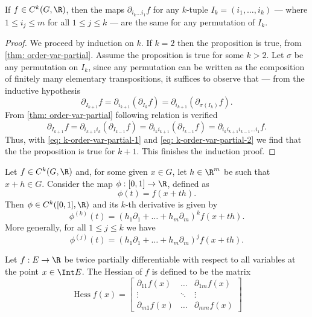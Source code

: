 \begin{corollary}\label{cor: k-order-var-partial}
  If \(f \in C^k(G, \R)\), then the maps \(\partial_{i_k \dots i_1} f\) for any
  \(k\)-tuple \(I_k = (i_1, \dots, i_k)\) --- where \(1 \leq i_j \leq m\) for
  all \(1 \leq j \leq k\) --- are the same for any permutation of \(I_k\).
\end{corollary}

\begin{proof}
  We proceed by induction on \(k\). If \(k = 2\) then the proposition is true,
  from \cref{thm: order-var-partial}. Assume the proposition is true for some
  \(k > 2\). Let \(\sigma\) be any permutation on \(I_k\), since any permutation
  can be written as the composition of finitely many elementary transpositions,
  it suffices to observe that --- from the inductive hypothesis
  \begin{equation}\label{eq: k-order-var-partial-1}
    \partial_{I_{k+1}} f
    = \partial_{i_{k+1}} \left( \partial_{I_k} f \right)
    = \partial_{i_{k+1}} \left( \partial_{\sigma(I_k)} f \right).
  \end{equation}
  From \cref{thm: order-var-partial} following relation is verified
  \begin{equation}\label{eq: k-order-var-partial-2}
    \partial_{I_{k+1}} f
    = \partial_{i_{k+1} i_k} \left( \partial_{I_{k-1}} f \right)
    = \partial_{i_k i_{k+1}} \left( \partial_{I_{k-1}} f \right)
    = \partial_{i_k i_{k+1} i_{k-1} \dots i_1} f.
  \end{equation}
  Thus, with \cref{eq: k-order-var-partial-1} and \cref{eq:
  k-order-var-partial-2} we find that the the proposition is true for \(k + 1\).
  This finishes the induction proof.
\end{proof}

\begin{example}\label{ex: taylor-auxiliar}
  Let \(f \in C^k(G, \R)\) and, for some given \(x \in G\), let \(h \in \R^m\) be
  such that \(x + h \in G\). Consider the map \(\phi: [0, 1] \to \R\), defined as
  \[
    \phi(t) = f(x + th).
  \]
  Then \(\phi \in C^k([0, 1], \R)\) and its \(k\)-th derivative is given by
  \[
    \phi^{(k)}(t) = (h_1 \partial_1 + \dots + h_m \partial_m)^k f(x + th).
  \]
  More generally, for all \(1 \leq j \leq k\) we have
  \[
    \phi^{(j)}(t) = (h_1 \partial_1 + \dots + h_m \partial_m)^j f(x + th).
  \]
\end{example}

\begin{definition}
  Let \(f: E \to \R\) be twice partially differentiable with respect to all
  variables at the point \(x \in \Int E\). The Hessian of \(f\) is defined to be
  the matrix
  \[
    \operatorname{Hess} f(x) =
    \begin{bmatrix}
      \partial_{1 1} f(x) &\dots &\partial_{1 m} f(x) \\
      \vdots &\ddots &\vdots \\
      \partial_{m 1} f(x) &\dots &\partial_{m m} f(x)
    \end{bmatrix}
  \]
\end{definition}

